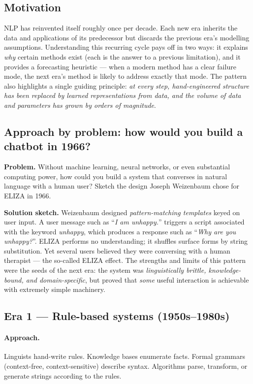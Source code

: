 \documentclass[12pt,a4paper]{report}
\theoremstyle{definition}
\theoremstyle{remark}
\begin{document}
\subsection{Motivation}
NLP has reinvented itself roughly once per decade. Each new era inherits the data and applications of its predecessor but discards the previous era's modelling assumptions. Understanding this recurring cycle pays off in two ways: it explains \emph{why} certain methods exist (each is the answer to a previous limitation), and it provides a forecasting heuristic --- when a modern method has a clear failure mode, the next era's method is likely to address exactly that mode. The pattern also highlights a single guiding principle: \emph{at every step, hand-engineered structure has been replaced by learned representations from data, and the volume of data and parameters has grown by orders of magnitude}.

\subsection{Approach by problem: how would you build a chatbot in 1966?}
\textbf{Problem.} Without machine learning, neural networks, or even substantial computing power, how could you build a system that converses in natural language with a human user? Sketch the design Joseph Weizenbaum chose for ELIZA in 1966.

\textbf{Solution sketch.} Weizenbaum designed \emph{pattern-matching templates} keyed on user input. A user message such as ``\emph{I am unhappy.}'' triggers a script associated with the keyword \emph{unhappy}, which produces a response such as ``\emph{Why are you unhappy?}''. ELIZA performs no understanding; it shuffles surface forms by string substitution. Yet several users believed they were conversing with a human therapist --- the so-called ELIZA effect. The strengths and limits of this pattern were the seeds of the next era: the system was \emph{linguistically brittle, knowledge-bound, and domain-specific}, but proved that \emph{some} useful interaction is achievable with extremely simple machinery.

\subsection{Era 1 --- Rule-based systems (1950s--1980s)}

\paragraph{Approach.} Linguists hand-write rules. Knowledge bases enumerate facts. Formal grammars (context-free, context-sensitive) describe syntax. Algorithms parse, transform, or generate strings according to the rules.
\end{document}
